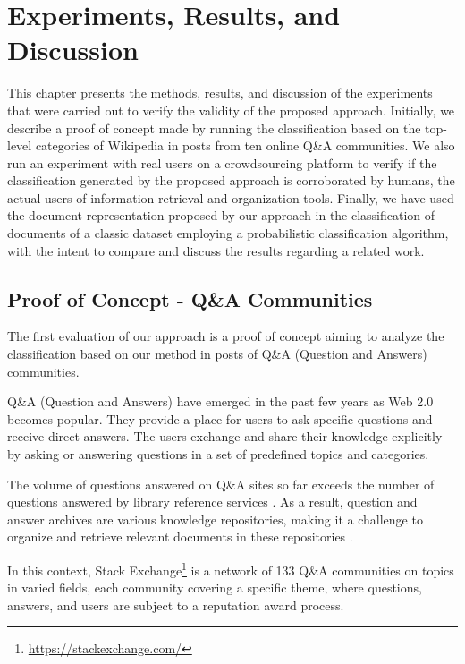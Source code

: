 \chapter{\hspace*{3pt} Experiments, Results, and Discussion}


\label{chapter:experiments}

This chapter presents the methods, results, and discussion of the experiments that were carried out to verify the validity of the proposed approach. Initially, we describe a proof of concept made by running the classification based on the top-level categories of Wikipedia in posts from ten online Q\&A communities.  We also run an experiment with real users on a crowdsourcing platform to verify if the classification generated by the proposed approach is corroborated by humans, the actual users of information retrieval and organization tools.
Finally, we have used the document representation proposed by our approach in the classification of documents of a classic dataset employing a probabilistic classification algorithm, with the intent to compare and discuss the results regarding a related work.

\section{\hspace*{3pt} Proof of Concept - Q\&A Communities}
\label{section:proof-of-concept}

The first evaluation of our approach is a proof of concept aiming to analyze the classification based on our method in posts of  Q\&A (Question and Answers) communities. 

Q\&A (Question and Answers) have emerged in the past few years as Web 2.0 becomes popular. They provide a place for users to ask specific questions and receive direct answers. 
The users exchange and share their knowledge explicitly by asking or answering questions in a set of predefined topics and categories. 

The volume of questions answered on Q\&A sites so far exceeds the number of questions answered by library reference services \cite{Shah:2010}. As a result, question and answer archives are various knowledge repositories, making it a challenge to organize and retrieve relevant documents in these repositories \cite{Andrzejewski:2009}.


In this context, Stack Exchange\footnote{\url{https://stackexchange.com/}}
is a network of 133 Q\&A communities on topics in varied fields, each community covering a specific theme, where questions, answers, and users are subject to a reputation award process.

